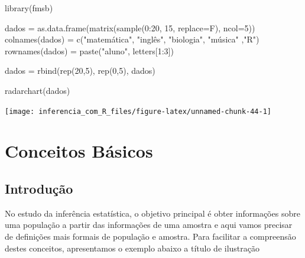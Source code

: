 \documentclass[
]{book}
\newenvironment{Shaded}{\begin{snugshade}}{\end{snugshade}}
\newcommand{\AttributeTok}[1]{\textcolor[rgb]{0.77,0.63,0.00}{#1}}
\newcommand{\DecValTok}[1]{\textcolor[rgb]{0.00,0.00,0.81}{#1}}
\newcommand{\FunctionTok}[1]{\textcolor[rgb]{0.00,0.00,0.00}{#1}}
\newcommand{\NormalTok}[1]{#1}
\newcommand{\OtherTok}[1]{\textcolor[rgb]{0.56,0.35,0.01}{#1}}
\newcommand{\SpecialCharTok}[1]{\textcolor[rgb]{0.00,0.00,0.00}{#1}}
\newcommand{\StringTok}[1]{\textcolor[rgb]{0.31,0.60,0.02}{#1}}
\begin{document}
\begin{Shaded}
\begin{Highlighting}[]
\FunctionTok{library}\NormalTok{(fmsb)}

\NormalTok{dados }\OtherTok{=} \FunctionTok{as.data.frame}\NormalTok{(}\FunctionTok{matrix}\NormalTok{(}\FunctionTok{sample}\NormalTok{(}\DecValTok{0}\SpecialCharTok{:}\DecValTok{20}\NormalTok{, }\DecValTok{15}\NormalTok{, }\AttributeTok{replace=}\NormalTok{F), }\AttributeTok{ncol=}\DecValTok{5}\NormalTok{))}
\FunctionTok{colnames}\NormalTok{(dados) }\OtherTok{=} \FunctionTok{c}\NormalTok{(}\StringTok{"matemática"}\NormalTok{, }\StringTok{"inglês"}\NormalTok{, }\StringTok{"biologia"}\NormalTok{, }\StringTok{"música"}\NormalTok{ ,}\StringTok{"R"}\NormalTok{)}
\FunctionTok{rownames}\NormalTok{(dados) }\OtherTok{=} \FunctionTok{paste}\NormalTok{(}\StringTok{"aluno"}\NormalTok{, letters[}\DecValTok{1}\SpecialCharTok{:}\DecValTok{3}\NormalTok{])}

\NormalTok{dados }\OtherTok{=} \FunctionTok{rbind}\NormalTok{(}\FunctionTok{rep}\NormalTok{(}\DecValTok{20}\NormalTok{,}\DecValTok{5}\NormalTok{), }\FunctionTok{rep}\NormalTok{(}\DecValTok{0}\NormalTok{,}\DecValTok{5}\NormalTok{), dados)}
 
\FunctionTok{radarchart}\NormalTok{(dados)}
\end{Highlighting}
\end{Shaded}

\begin{center}\texttt{[image: inferencia\_com\_R\_files/figure-latex/unnamed-chunk-44-1]} \end{center}

\hypertarget{conceitos-buxe1sicos}{%
\chapter{Conceitos Básicos}\label{conceitos-buxe1sicos}}

\hypertarget{introduuxe7uxe3o-2}{%
\section{Introdução}\label{introduuxe7uxe3o-2}}

No estudo da inferência estatística, o objetivo principal é obter informações sobre uma população a partir das informações de uma amostra e aqui vamos precisar de definições mais formais de população e amostra. Para facilitar a compreensão destes conceitos, apresentamos o exemplo abaixo a título de ilustração
\end{document}
